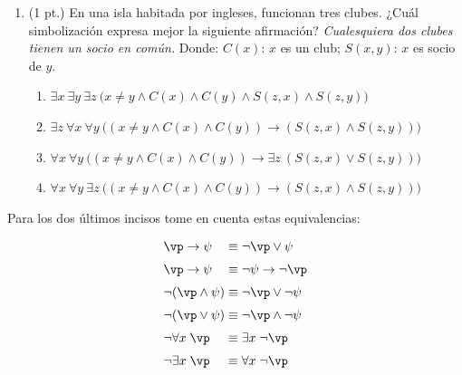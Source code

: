 \documentclass[12pt,letterpaper]{article}
\newcommand{\imp}{\rightarrow}
\begin{document}
\begin{enumerate}
\item (1 pt.) En una isla habitada por ingleses, funcionan tres clubes. ¿Cuál simbolización expresa mejor la siguiente afirmación? {\it Cualesquiera dos clubes tienen un socio en común.} Donde: $C(x)$: $x$ es un club; $S(x,y)$: $x$ es socio de $y$.
	\begin{enumerate}
	\item $\exists x\  \exists y\ \exists z\ \big(x\neq y \wedge C(x) \wedge C(y) \wedge S(z,x) \wedge S(z,y)\big)$
	\item $\exists z\ \forall x\  \forall y\ \big((x\neq y \wedge C(x) \wedge C(y)) \imp (S(z,x) \wedge S(z,y))\big)$
	\item $\forall x\  \forall y\ \big((x\neq y \wedge C(x) \wedge C(y)) \imp \exists z\ (S(z,x) \vee S(z,y))\big)$
	\item $\forall x\  \forall y\ \exists z\ \big((x\neq y \wedge C(x) \wedge C(y)) \imp (S(z,x) \wedge S(z,y))\big)$
	\end{enumerate}

\end{enumerate}

Para los dos últimos incisos tome en cuenta estas equivalencias:
\[\arraycolsep=1.4pt\def\arraystretch{1.5}
\begin{array}{lcl}
\vp \imp \psi &\equiv& \neg\vp \vee\psi\\
\vp \imp \psi &\equiv& \neg\psi \imp \neg\vp\\
\neg(\vp\wedge\psi) &\equiv& \neg\vp\vee\neg\psi\\
\neg(\vp\vee\psi) &\equiv& \neg\vp\wedge\neg\psi\\
\neg\forall x\;\vp &\equiv& \exists x\;\neg\vp\\
\neg\exists x\;\vp &\equiv& \forall x\;\neg\vp
\end{array}
\]
\end{document}
